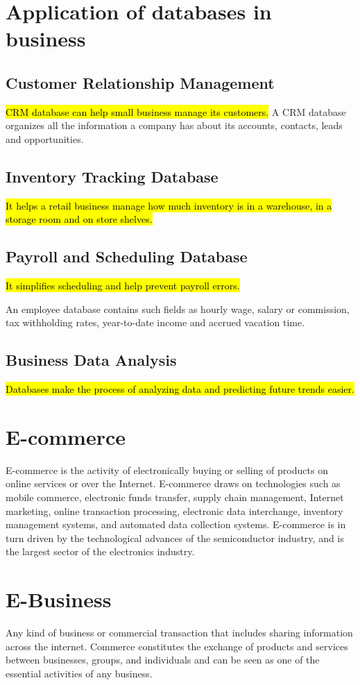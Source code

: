 \documentclass[12pt, a4paper]{article}
\begin{document}
\section{Application of databases in business}%
\subsection{Customer Relationship Management}
\hl{CRM database can help small business manage its customers.} A CRM
database organizes all the information a company has about its accounts,
contacts, leads and opportunities.

\subsection{Inventory Tracking Database}
\hl{It helps a retail business manage how much inventory is in a
warehouse, in a storage room and on store shelves.}

\subsection{Payroll and Scheduling Database}
\hl{It simplifies scheduling and help prevent payroll errors.}

An employee database contains such fields as hourly wage, salary or 
commission, tax withholding rates, year-to-date income and accrued vacation
time.

\subsection{Business Data Analysis}
\hl{Databases make the process of analyzing data and predicting future trends
easier.}

\section{E-commerce}%
E-commerce is the activity of electronically buying or selling of products on
online services or over the Internet. E-commerce draws on technologies such as
mobile commerce, electronic funds transfer, supply chain management, Internet
marketing, online transaction processing, electronic data interchange,
inventory management systems, and automated data collection systems.
E-commerce is in turn driven by the technological advances of the
semiconductor industry, and is the largest sector of the electronics industry.

\section{E-Business}%
Any kind of business or commercial transaction that includes sharing
information across the internet. Commerce constitutes the exchange of products
and services between businesses, groups, and individuals and can be seen as
one of the essential activities of any business.
\end{document}
